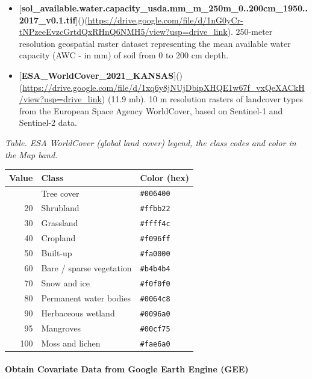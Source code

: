 \documentclass[
  10pt,
  b5paper,
  oneside]{book}
\begin{document}
\begin{itemize}
\item
  {[}\textbf{sol\_available.water.capacity\_usda.mm\_m\_250m\_0..200cm\_1950..2017\_v0.1.tif}{]}()(\url{https://drive.google.com/file/d/1nG0yCr-tNPzeeEvzcGrtdQxRHnQ6NMH5/view?usp=drive_link}). 250-meter resolution geospatial raster dataset representing the mean available water capacity (AWC - in mm) of soil from 0 to 200 cm depth.
\item
  {[}\textbf{ESA\_WorldCover\_2021\_KANSAS}{]}()(\url{https://drive.google.com/file/d/1xq6y8jNUjDbipXHQE1w67f_vxQeXACkH/view?usp=drive_link}) (11.9 mb). 10 m resolution rasters of landcover types from the European Space Agency WorldCover, based on Sentinel-1 and Sentinel-2 data.
\end{itemize}

\emph{Table. ESA WorldCover (global land cover) legend, the class codes and color in the Map band.}

\begin{longtable}[]{@{}rll@{}}
\toprule\noalign{}
Value & Class & Color (hex) \\
\midrule\noalign{}
\endhead
\bottomrule\noalign{}
\endlastfoot
10 & Tree cover & \texttt{\#006400} \\
20 & Shrubland & \texttt{\#ffbb22} \\
30 & Grassland & \texttt{\#ffff4c} \\
40 & Cropland & \texttt{\#f096ff} \\
50 & Built-up & \texttt{\#fa0000} \\
60 & Bare / sparse vegetation & \texttt{\#b4b4b4} \\
70 & Snow and ice & \texttt{\#f0f0f0} \\
80 & Permanent water bodies & \texttt{\#0064c8} \\
90 & Herbaceous wetland & \texttt{\#0096a0} \\
95 & Mangroves & \texttt{\#00cf75} \\
100 & Moss and lichen & \texttt{\#fae6a0} \\
\end{longtable}

\paragraph*{Obtain Covariate Data from Google Earth Engine (GEE)}\label{obtain-covariate-data-from-google-earth-engine-gee}
\end{document}
